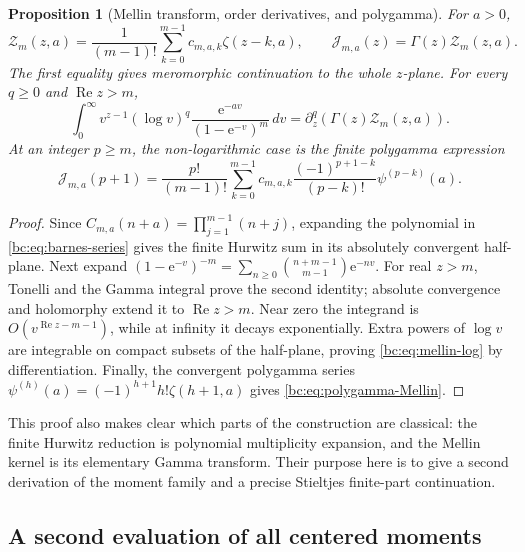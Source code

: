 \documentclass[11pt,letterpaper]{article}
\numberwithin{equation}{section}
\newtheorem{proposition}[theorem]{Proposition}
\theoremstyle{definition}
\theoremstyle{remark}
\newcommand{\bcRe}{\operatorname{Re}}
\newcommand{\bcZ}{\mathcal Z}
\newcommand{\bcJ}{\mathcal J}
\newcommand{\bce}{\mathrm e}
\begin{document}
\begin{proposition}[Mellin transform, order derivatives, and polygamma]
\label{bc:prop:mellin}
For $a>0$,
\begin{equation}\label{bc:eq:finite-hurwitz}
 \bcZ_m(z,a)=\frac1{(m-1)!}
                 \sum_{k=0}^{m-1}c_{m,a,k}\zeta(z-k,a),
 \qquad
 \bcJ_{m,a}(z)=\Gamma(z)\bcZ_m(z,a).
\end{equation}
The first equality gives meromorphic continuation to the whole
$z$-plane. For every $q\ge0$ and $\bcRe z>m$,
\begin{equation}\label{bc:eq:mellin-log}
 \int_0^\infty v^{z-1}(\log v)^q
              \frac{\bce^{-av}}{(1-\bce^{-v})^m}\,dv
 =\partial_z^q\left(\Gamma(z)\bcZ_m(z,a)\right).
\end{equation}
At an integer $p\ge m$, the non-logarithmic case is the finite
polygamma expression
\begin{equation}\label{bc:eq:polygamma-Mellin}
 \bcJ_{m,a}(p+1)=\frac{p!}{(m-1)!}
       \sum_{k=0}^{m-1}c_{m,a,k}
            \frac{(-1)^{p+1-k}}{(p-k)!}\psi^{(p-k)}(a).
\end{equation}
\end{proposition}
\begin{proof}
Since $C_{m,a}(n+a)=\prod_{j=1}^{m-1}(n+j)$, expanding the polynomial
in \eqref{bc:eq:barnes-series} gives the finite Hurwitz sum in its
absolutely convergent half-plane. Next expand
$(1-\bce^{-v})^{-m}=\sum_{n\ge0}\binom{n+m-1}{m-1}\bce^{-nv}$.
For real $z>m$, Tonelli and the Gamma integral prove the second identity;
absolute convergence and holomorphy extend it to $\bcRe z>m$.
Near zero the integrand is $O(v^{\bcRe z-m-1})$, while at infinity
it decays exponentially. Extra powers of $\log v$ are integrable on
compact subsets of the half-plane, proving
\eqref{bc:eq:mellin-log} by differentiation. Finally, the convergent
polygamma series
$\psi^{(h)}(a)=(-1)^{h+1}h!\zeta(h+1,a)$ gives
\eqref{bc:eq:polygamma-Mellin}.
\end{proof}

This proof also makes clear which parts of the construction are
classical: the finite Hurwitz reduction is polynomial multiplicity
expansion, and the Mellin kernel is its elementary Gamma transform.
Their purpose here is to give a second derivation of the moment family
and a precise Stieltjes finite-part continuation.

\subsection{A second evaluation of all centered moments}
\end{document}
